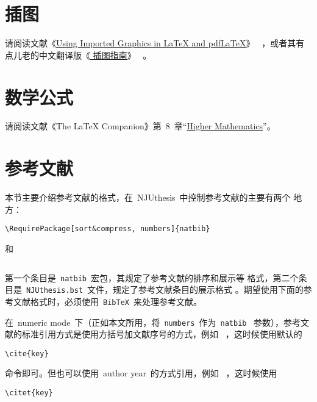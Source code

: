 \documentclass[oneside, phd]{njuthesis}
\begin{document}
\section{插图}

请阅读文献《\href{ftp://ftp.tex.ac.uk/tex-archive/info/epslatex.pdf}{Using Imported Graphics in \LaTeX{} and pdf\LaTeX{}}》
~\cite{Reckdahl2006}，或者其有点儿老的中文翻译版《\href{http://www.ctex.org/documents/latex/graphics/}{\LaTeXe{} 插图指南}》
~\cite{Wang1997}。

\section{数学公式}

请阅读文献《The LaTeX Companion》第~8~章``\href{http://media.cism.it/attachments/ch8.pdf}{Higher Mathematics}''\cite{Goossens1997}。


\section{参考文献}

本节主要介绍参考文献的格式，在~NJUthesis~中控制参考文献的主要有两个
地方：

\begin{verbatim}
\RequirePackage[sort&compress, numbers]{natbib}
\end{verbatim}

\noindent 和

\begin{verbatim}

\end{verbatim}

\noindent 第一个条目是~\texttt{natbib}~宏包，其规定了参考文献的排序和展示等
格式，第二个条目是~\texttt{NJUthesis.bst}~文件，规定了参考文献条目的展示格式
。期望使用下面的参考文献格式时，必须使用~\texttt{BibTeX}~来处理参考文献。

在~numeric mode~下（正如本文所用，将~\texttt{numbers}~作为~\texttt{natbib}~
 参数），参考文献的标准引用方式是使用方括号加文献序号的方式，例如~
\cite{Al-Osh1987}，这时候使用默认的~

\begin{verbatim}
\cite{key}
\end{verbatim}

\noindent 命令即可。但也可以使用~author year~的方式引用，例如~
\citet{Al-Osh1987}，这时候使用

\begin{verbatim}
\citet{key}
\end{verbatim}
\end{document}
